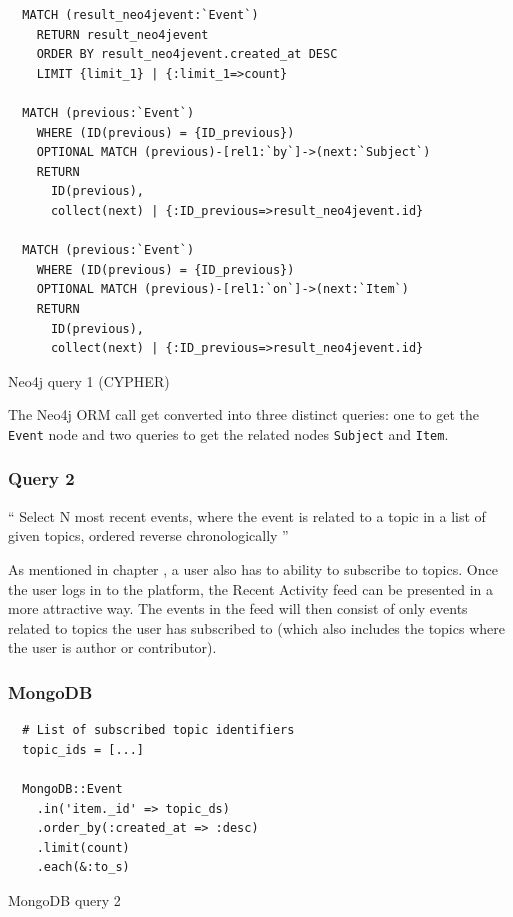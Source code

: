 \begin{listing}
  \begin{verbatim}
  MATCH (result_neo4jevent:`Event`)
    RETURN result_neo4jevent
    ORDER BY result_neo4jevent.created_at DESC
    LIMIT {limit_1} | {:limit_1=>count}

  MATCH (previous:`Event`)
    WHERE (ID(previous) = {ID_previous})
    OPTIONAL MATCH (previous)-[rel1:`by`]->(next:`Subject`)
    RETURN
      ID(previous),
      collect(next) | {:ID_previous=>result_neo4jevent.id}

  MATCH (previous:`Event`)
    WHERE (ID(previous) = {ID_previous})
    OPTIONAL MATCH (previous)-[rel1:`on`]->(next:`Item`)
    RETURN
      ID(previous),
      collect(next) | {:ID_previous=>result_neo4jevent.id}
  \end{verbatim}

  \caption{Neo4j query 1 (CYPHER)}
  \label{lst:neo4j-query-1-cypher}
\end{listing}

The Neo4j ORM call get converted into three distinct queries: one to get the \texttt{Event} node and two queries to get the related nodes \texttt{Subject} and \texttt{Item}.

\subsubsection{Query 2}
\label{subsubsec:query-2}

``
Select N most recent events, where the event is related to a topic in a list of given topics, ordered reverse chronologically
''

As mentioned in chapter , a user also has to ability to subscribe to topics.
Once the user logs in to the platform, the Recent Activity feed can be presented in a more attractive way.
The events in the feed will then consist of only events related to topics the user has subscribed to (which also includes the topics where the user is author or contributor).

\subsubsection*{MongoDB}

\begin{listing}[H]
  \begin{verbatim}
  # List of subscribed topic identifiers
  topic_ids = [...]

  MongoDB::Event
    .in('item._id' => topic_ds)
    .order_by(:created_at => :desc)
    .limit(count)
    .each(&:to_s)
  \end{verbatim}

  \caption{MongoDB query 2}
  \label{lst:mongodb-query-2}
\end{listing}


